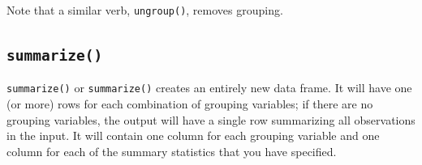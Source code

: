 \documentclass[]{book}
\newenvironment{Shaded}{\begin{snugshade}}{\end{snugshade}}
\newcommand{\CommentTok}[1]{\textcolor[rgb]{0.56,0.35,0.01}{\textit{#1}}}
\newcommand{\DataTypeTok}[1]{\textcolor[rgb]{0.13,0.29,0.53}{#1}}
\newcommand{\DecValTok}[1]{\textcolor[rgb]{0.00,0.00,0.81}{#1}}
\newcommand{\ErrorTok}[1]{\textcolor[rgb]{0.64,0.00,0.00}{\textbf{#1}}}
\newcommand{\FloatTok}[1]{\textcolor[rgb]{0.00,0.00,0.81}{#1}}
\newcommand{\KeywordTok}[1]{\textcolor[rgb]{0.13,0.29,0.53}{\textbf{#1}}}
\newcommand{\NormalTok}[1]{#1}
\newcommand{\OperatorTok}[1]{\textcolor[rgb]{0.81,0.36,0.00}{\textbf{#1}}}
\newcommand{\StringTok}[1]{\textcolor[rgb]{0.31,0.60,0.02}{#1}}
\begin{document}
\begin{Shaded}
\end{Shaded}

Note that a similar verb, \texttt{ungroup()}, removes grouping.

\hypertarget{summarize}{%
\subsection*{\texorpdfstring{\texttt{summarize()}}{summarize()}}\label{summarize}}

\texttt{summarize()} or \texttt{summarize()} creates an entirely new data frame. It will have one (or more) rows for each combination of grouping variables; if there are no grouping variables, the output will have a single row summarizing all observations in the input. It will contain one column for each grouping variable and one column for each of the summary statistics that you have specified.

\begin{Shaded}
\end{Shaded}
\end{document}
